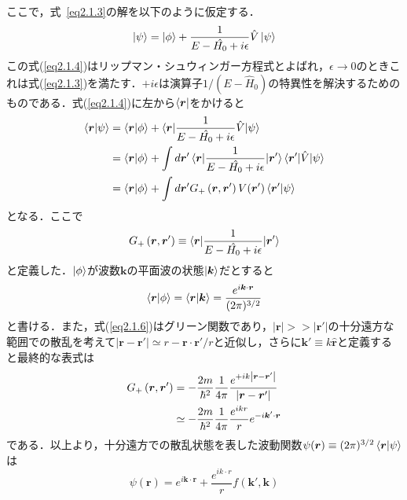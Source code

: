 \documentclass[11pt,a4j,notitlepage]{jreport}
\newcommand{\eq}[1]{式~\eqref{#1}}	%
\begin{document}
ここで，\eq{eq2.1.3}の解を以下のように仮定する．
\begin{equation}
	\ket{\psi} = \ket{\phi} + \frac{1}{E-\hat{H_0}+i \epsilon} \hat{V} \ket{\psi}
	\label{eq2.1.4}
\end{equation}
この式(\ref{eq2.1.4})はリップマン・シュウィンガー方程式とよばれ，$\epsilon \rightarrow 0$のときこれは式(\ref{eq2.1.3})を満たす．$+ i \epsilon$は演算子$1/(E-\hat{H}_{0})$の特異性を解決するためのものである．式(\ref{eq2.1.4})に左から$\bra{\bm{r}}$をかけると
\begin{align}
	\braket{\bm{r} | \psi}
	& = \braket{\bm{r} | \phi} + \braket{\bm{r} | \frac{1}{E-\hat{H_0}+i \epsilon} \hat{V} | \psi} \notag \\
	& = \braket{\bm{r} | \phi} + \int d \bm{r}' \braket{\bm{r} | \frac{1}{E-\hat{H_0}+i \epsilon} | \bm{r}'}\braket{\bm{r}' | \hat{V} | \psi} \notag \\
	& = \braket{\bm{r} | \phi} + \int d \bm{r}' G_{+}\left( \bm{r}, \bm{r}' \right) V(\bm{r}') \braket{\bm{r}' | \psi}
	\label{eq2.1.5}
\end{align}
となる．ここで
\begin{equation}
	G_{+}\left( \bm{r}, \bm{r}' \right) \equiv \braket{\bm{r} | \frac{1}{E-\hat{H_0}+i \epsilon} | \bm{r}'}
	\label{eq2.1.6}
\end{equation}
と定義した．$\ket{\phi}$が波数$\bm{k}$の平面波の状態$\ket{\bm{k}}$だとすると
\begin{equation}
	\braket{\bm{r} | \phi} = \braket{\bm{r} | \bm{k}} = \frac{e^{i \bm{k} \cdot \bm{r}}}{(2\pi)^{3/2}}
	\label{eq2.1.7}
\end{equation}
と書ける\cite{igikawa}．また，式(\ref{eq2.1.6})はグリーン関数であり，$|\bm{r}|>>\left|\bm{r}' \right|$の十分遠方な範囲での散乱を考えて$\left|\bm{r}-\bm{r}' \right| \simeq r-\bm{r} \cdot \bm{r}' / r$と近似し，さらに$\bm{k}' \equiv k \hat{\bm{r}}$と定義すると最終的な表式は
\begin{align}
	G_{+}\left( \bm{r}, \bm{r}' \right)
	 & = - \frac{2 m}{\hbar^{2}} \frac{1}{4 \pi} \frac{e^{+i k \left|\bm{r}-\bm{r}' \right|}}{\left|\bm{r}-\bm{r}' \right|} \notag \\
	 & \simeq - \frac{2 m}{\hbar^{2}} \frac{1}{4 \pi} \frac{e^{i k r}}{r} e^{-i \bm{k}^{\prime} \cdot \bm{r}}
	\label{eq2.1.8}
\end{align}
である．以上より，十分遠方での散乱状態を表した波動関数$\psi(\bm{r}) \equiv (2\pi)^{3/2} \braket{\bm{r} | \psi}$は
\begin{equation}
	\psi(\bm{r}) = e^{i \bm{k} \cdot \bm{r}}+\frac{e^{i k \cdot r}}{r} f\left(\bm{k}', \bm{k}\right)
	\label{eq2.1.9}
\end{equation}
\end{document}
